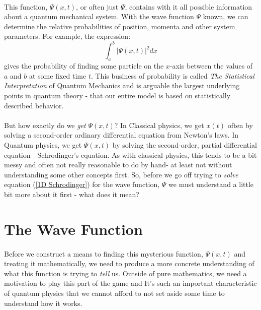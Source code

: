 \documentclass[12pt,letterpaper]{book}
\begin{document}
\paragraph*{}This function, $\Psi(x,t)$, or often just $\Psi$, contains with it all possible information about a quantum mechanical system. With the wave function $\Psi$ known, we can determine the relative probabilities of position, momenta and other system parameters. For example, the expression:
\begin{equation}
\label{prob_ab}
\int_a^b \big | \Psi(x,t) \big|^2 dx
\end{equation}
gives the probability of finding some particle on the $x$-axis between the values of $a$ and $b$ at some fixed time $t$. This business of probability is called \textit{The Statistical Interpretation} of Quantum Mechanics and is arguable the largest underlying points in quantum theory - that our entire model is based on statistically described behavior.
\paragraph*{}But how exactly do we \textit{get} $\Psi(x,t)$? In Classical physics, we get $x(t)$ often by solving a second-order ordinary differential equation from Newton's laws. In Quantum physics, we get $\Psi(x,t)$ by solving the second-order, partial differential equation - Schrodinger's equation. As with classical physics, this tends to be a bit messy and often not really reasonable to do by hand- at least not without understanding some other concepts first. So, before we go off trying to \textit{solve} equation (\ref{1D Schrodinger}) for the wave function, $\Psi$ we must understand a little bit more about it first - what does it mean?



\section{The Wave Function}

\paragraph*{}Before we construct a means to finding this mysterious function, $\Psi(x,t)$ and treating it mathematically, we need to produce a more concrete understanding of what this function is trying to \textit{tell} us. Outside of pure mathematics, we need a motivation to play this part of the game and It's such an important characteristic of quantum physics that we cannot afford to not set aside some time to understand how it works.
\end{document}
